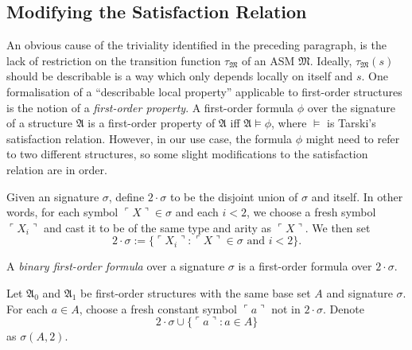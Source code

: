 \documentclass[12pt]{article}
\numberwithin{equation}{section}
\begin{document}
\subsection{Modifying the Satisfaction Relation}

An obvious cause of the triviality identified in the preceding paragraph, is the lack of restriction on the transition function $\tau_{\mathfrak{M}}$ of an ASM $\mathfrak{M}$. Ideally, $\tau_{\mathfrak{M}}(s)$ should be describable is a way which only depends locally on itself and $s$. One formalisation of a ``describable local property'' applicable to first-order structures is the notion of a \emph{first-order property}. A first-order formula $\phi$ over the signature of a structure $\mathfrak{A}$ is a first-order property of $\mathfrak{A}$ iff $\mathfrak{A} \models \phi$, where $\models$ is Tarski's satisfaction relation. However, in our use case, the formula $\phi$ might need to refer to two different structures, so some slight modifications to the satisfaction relation are in order.

\begin{defi}
Given an signature $\sigma$, define $2 \cdot \sigma$ to be the disjoint union of $\sigma$ and itself. In other words, for each symbol $\ulcorner X \urcorner \in \sigma$ and each $i < 2$, we choose a fresh symbol $\ulcorner X_{i} \urcorner$ and cast it to be of the same type and arity as $\ulcorner X \urcorner$. We then set
\begin{equation*}
    2 \cdot \sigma := \{\ulcorner X_{i} \urcorner : \ulcorner X \urcorner \in \sigma \text{ and } i < 2\} \text{.}
\end{equation*}
\end{defi}

\begin{defi}
A \emph{binary first-order formula} over a signature $\sigma$ is a first-order formula over $2 \cdot \sigma$.
\end{defi}

\begin{defi}
Let $\mathfrak{A}_0$ and $\mathfrak{A}_1$ be first-order structures with the same base set $A$ and signature $\sigma$. For each $a \in A$, choose a fresh constant symbol $\ulcorner a \urcorner$ not in $2 \cdot \sigma$. Denote
\begin{equation*}
    2 \cdot \sigma \cup \{\ulcorner a \urcorner : a \in A\}
\end{equation*}
as $\sigma(A, 2)$.
\end{defi}
\end{document}
